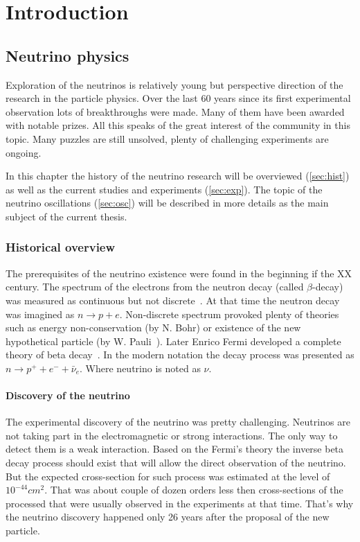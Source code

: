 \documentclass[../main.tex]{subfiles}
\begin{document}
\renewcommand{\labelitemi}{\ding{226}}
\renewcommand{\labelitemii}{\ding{227}}


\part{Introduction}
\label{part:intro:general}

\chapter{Neutrino physics}
Exploration of the neutrinos is relatively young but perspective direction of the research in the particle physics. Over the last 60 years since its first experimental observation lots of breakthroughs were made. Many of them have been awarded with notable prizes. All this speaks of the great interest of the community in this topic. Many puzzles are still unsolved, plenty of challenging experiments are ongoing.

In this chapter the history of the neutrino research will be overviewed (\autoref{sec:hist}) as well as the current studies and experiments (\autoref{sec:exp}). The topic of the neutrino oscillations (\autoref{sec:osc}) will be described in more details as the main subject of the current thesis.

\section{Historical overview}
\label{sec:hist}
The prerequisites of the neutrino existence were found in the beginning if the XX century. The spectrum of the electrons from the neutron decay (called $\beta$-decay) was measured as continuous but not discrete~\cite{Chadwick1914}. At that time the neutron decay was imagined as $n\to p+e$. Non-discrete spectrum provoked plenty of theories such as energy non-conservation (by N. Bohr) or existence of the new hypothetical particle (by W. Pauli~\cite{Pauli1930}). Later Enrico Fermi developed a complete theory of beta decay~\cite{Fermi1934}. In the modern notation the decay process was presented as $n\to p^++e^-+\bar{\nu}_e$. Where neutrino is noted as $\nu$.

\subsection{Discovery of the neutrino}
The experimental discovery of the neutrino was pretty challenging. Neutrinos are not taking part in the electromagnetic or strong interactions. The only way to detect them is a weak interaction. Based on the Fermi's theory the inverse beta decay process should exist that will allow the direct observation of the neutrino. But the expected cross-section for such process was estimated at the level of $10^{-44} cm^2$. That was about couple of dozen orders less then cross-sections of the processed that were usually observed in the experiments at that time. That's why the neutrino discovery happened only 26 years after the proposal of the new particle.
\end{document}
